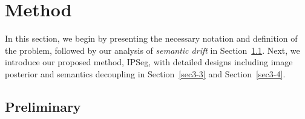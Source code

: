 \section{Method}
\label{sec:Method}


% 

In this section, we begin by presenting the necessary notation and definition of the problem, followed by our analysis of \textit{semantic drift} in Section~\ref{sec3-1:preliminary}. Next, we introduce our proposed method, IPSeg, with detailed designs including image posterior and semantics decoupling in Section~\ref{sec3-3} and Section~\ref{sec3-4}.



\subsection{Preliminary}
\label{sec3-1:preliminary}


